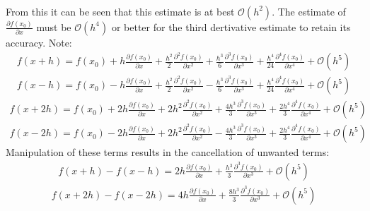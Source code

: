 \documentclass[12pt,a4]{article}
\begin{document}
\begin{enumerate}
\begin{enumerate}
\begin{align}
        \end{align}
        From this it can be seen that this estimate is at best $\mathscr{O}(h^2)$.
        The estimate of $\frac{\partial f(x_0)}{\partial x}$ must be $\mathscr{O}(h^4)$ or better for the third dertivative estimate to retain its accuracy.
        Note:
        \begin{align*}
          f(x + h) = f(x_0) + h \frac{\partial f(x_0)}{\partial x} + \frac{h^2}{2} \frac{\partial^2 f(x_0)}{\partial x^2} + \frac{h^3}{6} \frac{\partial^3 f(x_0)}{\partial x^3} + \frac{h^4}{24} \frac{\partial^4 f(x_0)}{\partial x^4} + \mathscr{O}(h^5) %
        \end{align*}
        \begin{align*}
          f(x - h) = f(x_0) - h \frac{\partial f(x_0)}{\partial x} + \frac{h^2}{2} \frac{\partial^2 f(x_0)}{\partial x^2} - \frac{h^3}{6} \frac{\partial^3 f(x_0)}{\partial x^3} + \frac{h^4}{24} \frac{\partial^4 f(x_0)}{\partial x^4} + \mathscr{O}(h^5) %
        \end{align*}
        \begin{align*}
          f(x + 2 h) = f(x_0) + 2 h \frac{\partial f(x_0)}{\partial x} + 2 h^2 \frac{\partial^2 f(x_0)}{\partial x^2} + \frac{4 h^3}{3} \frac{\partial^3 f(x_0)}{\partial x^3} + \frac{2 h^4}{3} \frac{\partial^4 f(x_0)}{\partial x^4} + \mathscr{O}(h^5) %
        \end{align*}
        \begin{align*}
          f(x - 2 h) = f(x_0) - 2 h \frac{\partial f(x_0)}{\partial x} + 2 h^2 \frac{\partial^2 f(x_0)}{\partial x^2} - \frac{4 h^3}{3} \frac{\partial^3 f(x_0)}{\partial x^3} + \frac{2 h^4}{3} \frac{\partial^4 f(x_0)}{\partial x^4} + \mathscr{O}(h^5) %
        \end{align*}
        Manipulation of these terms results in the cancellation of unwanted terms:
        \begin{align*}
          f(x + h) - f(x - h) =  2 h \frac{\partial f(x_0)}{\partial x} + \frac{h^3}{3} \frac{\partial^3 f(x_0)}{\partial x^3} + \mathscr{O}(h^5) %
        \end{align*}
        \begin{align*}
          f(x + 2 h) - f(x - 2 h) = 4 h \frac{\partial f(x_0)}{\partial x} + \frac{8 h^3}{3} \frac{\partial^3 f(x_0)}{\partial x^3} + \mathscr{O}(h^5) %

\end{align*}
\end{enumerate}
\end{enumerate}
\end{document}
